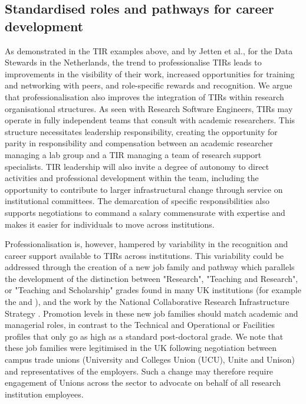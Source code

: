 \documentclass[authordate,meta]{jote-new-article}
\begin{document}
\subsection{Standardised roles and pathways for career development}



As demonstrated in the TIR examples above, and by Jetten et al., \parencites{Jetten2021} for the Data Stewards in the Netherlands, the trend to professionalise TIRs leads to improvements in the visibility of their work, increased opportunities for training and networking with peers, and role-specific rewards and recognition. We argue that professionalisation also improves the integration of TIRs within research organisational structures. As seen with Research Software Engineers, TIRs may operate in fully independent teams that consult with academic researchers. This structure necessitates leadership responsibility, creating the opportunity for parity in responsibility and compensation between an academic researcher managing a lab group and a TIR managing a team of research support specialists. TIR leadership will also invite a degree of autonomy to direct activities and professional development within the team, including the opportunity to contribute to larger infrastructural change through service on institutional committees. The demarcation of specific responsibilities also supports negotiations to command a salary commensurate with expertise and makes it easier for individuals to move across institutions.







Professionalisation is, however, hampered by variability in the recognition and career support available to TIRs across institutions. This variability could be addressed through the creation of a new job family and pathway which parallels the development of the distinction between "Research", "Teaching and Research", or "Teaching and Scholarship" grades found in many UK institutions (for example the \textcites{Universitysussex_academic_2019} and \textcites{UniversityofStAndrews2015}), and the work by the National Collaborative Research Infrastructure Strategy \parencites{NCRIS2022}. Promotion levels in these new job families should match academic and managerial roles, in contrast to the Technical and Operational or Facilities profiles that only go as high as a standard post-doctoral grade. We note that these job families were legitimised in the UK following negotiation between campus trade unions (University and Colleges Union (UCU), Unite and Unison) and representatives of the employers. Such a change may therefore require engagement of Unions across the sector to advocate on behalf of all research institution employees.
\end{document}

